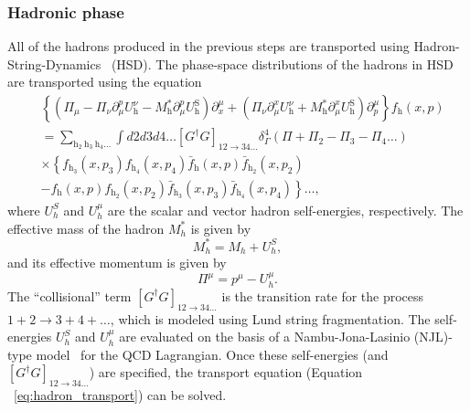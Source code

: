 \subsubsection{Hadronic phase}
All of the hadrons produced in the previous steps are transported using Hadron-String-Dynamics~\cite{HSD} (HSD). The phase-space distributions of the hadrons in HSD are transported using the equation
\begin{equation}
\label{eq:hadron_transport}
\begin{aligned}
& \left\{\left(\Pi_\mu-\Pi_\nu \partial_\mu^p U_{\mathrm{h}}^\nu-M_{\mathrm{h}}^* \partial_\mu^p U_{\mathrm{h}}^{\mathrm{S}}\right) \partial_x^\mu+\left(\Pi_\nu \partial_\mu^x U_{\mathrm{h}}^\nu+M_{\mathrm{h}}^* \partial_\mu^x U_{\mathrm{h}}^{\mathrm{S}}\right) \partial_p^\mu\right\} f_{\mathrm{h}}(x, p) \\
& =\sum_{\mathrm{h}_2 \mathrm{~h}_3 \mathrm{~h}_4 \ldots} \int d 2 d 3 d 4 \ldots\left[G^{\dagger} G\right]_{12 \rightarrow 34 \ldots} \delta_{\Gamma}^4\left(\Pi+\Pi_2-\Pi_3-\Pi_4 \ldots\right) \\
& \times\left\{f_{\mathrm{h}_3}\left(x, p_3\right) f_{\mathrm{h}_4}\left(x, p_4\right) \bar{f}_{\mathrm{h}}(x, p) \bar{f}_{\mathrm{h}_2}\left(x, p_2\right)\right. \\
& \left.-f_{\mathrm{h}}(x, p) f_{\mathrm{h}_2}\left(x, p_2\right) \bar{f}_{\mathrm{h}_3}\left(x, p_3\right) \bar{f}_{\mathrm{h}_4}\left(x, p_4\right)\right\} \ldots,
\end{aligned}
\end{equation}
where $U_h^S$ and $U_h^\mu$ are the scalar and vector hadron self-energies, respectively. The effective mass of the hadron $M_h^*$ is given by
\begin{equation}
    M_h^* = M_h + U_h^S,
\end{equation}
and its effective momentum is given by
\begin{equation}
    \Pi^\mu = p^\mu - U_h^\mu.
\end{equation}
The ``collisional'' term $\left[G^\dagger G\right]_{12 \rightarrow 34 \ldots}$ is the transition rate for the process $1 + 2 \rightarrow 3 + 4 + \ldots$, which is modeled using Lund string fragmentation. The self-energies $U_h^S$ and $U_h^\mu$ are evaluated on the basis of a Nambu-Jona-Lasinio (NJL)-type model~\cite{NJL} for the QCD Lagrangian. Once these self-energies (and $\left[G^\dagger G\right]_{12 \rightarrow 34 \ldots}$) are specified, the transport equation (Equation ~\ref{eq:hadron_transport}) can be solved.

